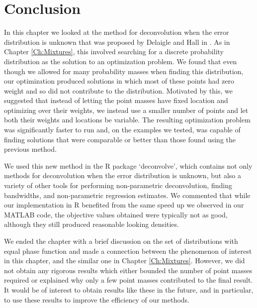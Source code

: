 	


\section{Conclusion}

In this chapter we looked at the method for deconvolution when the error distribution is unknown that was proposed by Delaigle and Hall in \cite{Delaigle2016-la}. As in Chapter \ref{Ch:Mixtures}, this involved searching for a discrete probability distribution as the solution to an optimization problem. We found that even though we allowed for many probability masses when finding this distribution, our optimization produced solutions in which most of these points had zero weight and so did not contribute to the distribution. Motivated by this, we suggested that instead of letting the point masses have fixed location and optimizing over their weights, we instead use a smaller number of points and let both their weights and locations be variable. The resulting optimization problem was significantly faster to run and, on the examples we tested, was capable of finding solutions that were comparable or better than those found using the previous method.

We used this new method in the R package `deconvolve', which contains not only methods for deconvolution when the error distribution is unknown, but also a variety of other tools for performing non-parametric deconvolution, finding bandwidths, and non-parametric regression estimates. We commented that while our implementation in R benefited from the same speed up we observed in our MATLAB code, the objective values obtained were typically not as good, although they still produced reasonable looking densities.

We ended the chapter with a brief discussion on the set of distributions with equal phase function and made a connection between the phenomenon of interest in this chapter, and the similar one in Chapter \ref{Ch:Mixtures}. However, we did not obtain any rigorous results which either bounded the number of point masses required or explained why only a few point masses contributed to the final result. It would be of interest to obtain results like these in the future, and in particular, to use these results to improve the efficiency of our methods.